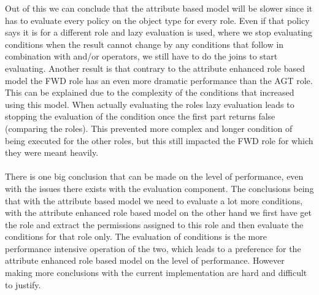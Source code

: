 Out of this we can conclude that the attribute based model will be slower since it has to evaluate every policy on the object type for every role.
Even if that policy says it is for a different role and lazy evaluation is used, where  we stop evaluating conditions when the result cannot change by any conditions that follow in combination with and/or operators, we still have to do the joins to start evaluating.
Another result is that contrary to the attribute enhanced role based model the FWD role has an even more dramatic performance than the AGT role.
This can be explained due to the complexity of the conditions that  increased using this model.
When actually evaluating the roles lazy evaluation leads to stopping the evaluation of the condition once the first part returns false (comparing the roles).
This prevented more complex and longer condition of being executed for the other roles, but this still impacted the FWD role for which they were meant heavily.
\\
\\
There is one big conclusion that can be made on the level of performance, even with the issues there exists with the evaluation component.
The conclusions being that with the attribute based model we need to evaluate a lot more conditions, with the attribute enhanced role based model on the other hand we first have get the role and extract the permissions assigned to this role and then evaluate the conditions for that role only.
The evaluation of conditions is the more performance intensive operation of the two, which leads to a preference for the attribute enhanced role based model on the level of performance.
However making more conclusions with the current implementation are hard  and difficult to justify.

